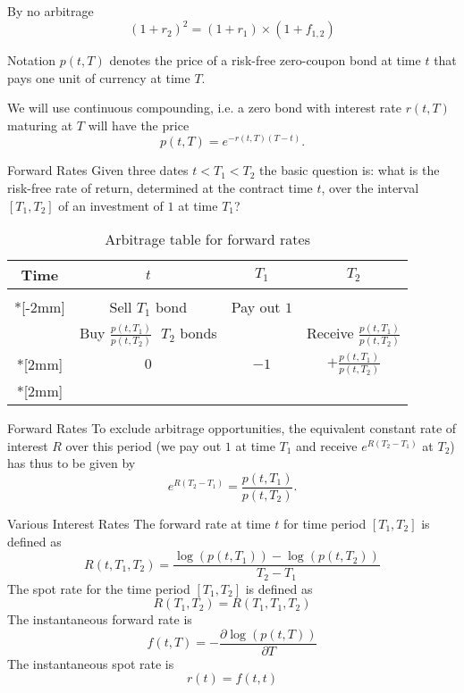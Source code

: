 	By no arbitrage
		$$
		(1+r_2)^2=(1+r_1) \times (1+f_{1,2})
		$$


Notation
	$p(t,T)$ denotes the price of a risk-free zero-coupon bond at time
	$t$ that pays one unit of currency at time $T$.

We will use continuous compounding, i.e. a zero bond with interest
rate $r(t,T)$ maturing at $T$ will have the price
	$$p(t,T)=e^{-r(t,T)(T-t)}.$$


Forward Rates
	Given three dates $t < T_1 <
	T_2$ the basic question is: what is the risk-free rate of return,
	determined at the contract time $t$, over the interval $[T_1,T_2]$
	of an investment of $1$ at time $T_1$?\\

\begin{table}[htbp]
	\begin{center}
	\begin{tabular}{|c|c|c|c|}
	\hline
	{\rule[-3mm]{0mm}{8mm} Time }& $t$ & $T_1$ & $T_2$\\
	\hline & & & \\*[-2mm]
	& Sell $T_1$ bond & Pay out $1$ & \\
	& Buy $\frac{p(t,T_1)}{p(t,T_2)}\;$ $T_2$ bonds & & Receive
	$\frac{p(t,T_1)}{p(t,T_2)}$\\*[2mm] \hline {\rule[-3mm]{0mm}{8mm}
	Net investment} & $0$ & $-1$ &
	$+\frac{p(t,T_1)}{p(t,T_2)}$\\*[2mm] \hline
	\end{tabular}
	\end{center}
	\caption{Arbitrage table for forward rates}
\end{table}


Forward Rates
	To exclude arbitrage opportunities, the equivalent constant rate
	of interest $R$ over this period (we pay out $1$ at time $T_1$ and
	receive $e^{R(T_2-T_1)}$ at $T_2$) has thus to be given by
	$$
	e^{R(T_2-T_1)} = \frac{p(t, T_1)}{p(t, T_2)}.
	$$


Various Interest Rates
	The forward rate at time $t$ for time period $[T_1,T_2]$ is defined as
		\[
		R(t,T_1,T_2)=\frac{\log(p(t,T_1))-\log(p(t,T_2))}{T_2-T_1}
		\]
	The spot rate for the time period $[T_1,T_2]$ is defined as
		\[
		R(T_1,T_2)=R(T_1,T_1,T_2)
		\]
	The instantaneous forward rate is
		\[
		f(t,T)=-\frac{\partial \log(p(t,T))}{\partial T}
		\]
  The instantaneous spot rate is
		\[
		r(t)=f(t,t)
		\]


